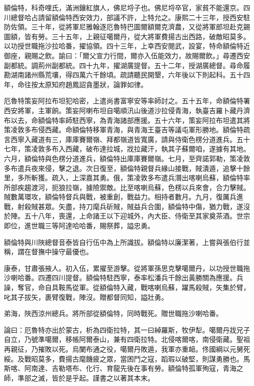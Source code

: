 \begin{pinyinscope}
額倫特，科奇哩氏，滿洲鑲紅旗人，佛尼埒子也。佛尼埒卒官，家貧不能還京。四川總督哈占請留額倫特西安效力，部議不許，上特允之。康熙二十三年，授西安駐防佐領。三十年，從將軍尼雅翰逐厄魯特巴圖爾額爾克濟農，又從將軍郎坦赴克錫圖額，皆有勞。三十五年，上親征噶爾丹，從大將軍費揚古出西路，破敵昭莫多。以功授世職拖沙拉哈番，擢協領。四十三年，上幸西安閱武，設宴，特命額倫特近御座，親賜之飲。諭曰：「爾父宣力行間，爾亦入伍能效力，故賜爾飲。」尋遷西安副都統。調荊州副都統。四十九年，擢湖廣提督。五十二年，授湖廣總督。尋命履勘湖南諸州縣荒壤，得四萬六千餘頃。疏請聽民開墾，六年後以下則起科。五十四年，命往按太原知府趙鳳詔貪墨狀，論罪如律。

厄魯特策妄阿拉布坦犯哈密，上遣尚書富寧安等率師討之。五十五年，命額倫特署西安將軍，主軍餉。策妄阿喇布坦自噶順汛山後道沙拉侵青海，執臺吉羅卜藏丹濟布以去，命額倫特率師駐西寧，為青海諸部應援。五十六年，策妄阿拉布坦遣其將策凌敦多布侵西藏。命額倫特移軍青海，與青海王臺吉等議屯軍形勝地。額倫特疏言西寧入藏道有三，庫庫賽爾嶺、拜都嶺道皆寬廣，請與侍衛色楞分道進兵。五十七年，策凌敦多布入西藏，破布達拉城，戕拉藏汗，執其子蘇爾咱，遂據有其地。六月，額倫特與色楞分道進兵，額倫特出庫庫賽爾嶺。七月，至齊諾郭勒，策凌敦多布遣兵夜來侵，擊之退。次日復至，額倫特親督兵緣山接戰，賊潰遁，追擊十餘里，多所斬獲。疏入，上深嘉其勇。俄，策凌敦多布遣兵潛出喀喇烏蘇，額倫特率所部疾趨渡河，扼狼拉嶺，據險禦敵。比至喀喇烏蘇，色楞以兵來會，合力擊賊。賊數萬環攻，額倫特督兵與戰，被重創，戰益力。相持者數月。九月，復厲兵進戰，射殺賊甚眾。矢盡，持刀麾兵斫賊，賊益兵合圍，額倫特中傷，猶力戰，遂沒於陣。五十八年，喪還，上命諸王以下迎城外，內大臣、侍衛至其家奠茶酒。世宗即位，進世職三等阿達哈哈番，賜祭葬，謚忠勇。

額倫特與川陜總督音泰皆自行伍中為上所識拔。額倫特以廉潔著，上嘗與張伯行並稱，謂在督撫中操守最優也。

康泰，甘肅張掖人。初入伍，累擢至游擊。從將軍孫思克擊噶爾丹，以功授世職拖沙喇哈番。四遷四川提督。額倫特駐西寧，泰率松潘兵千餘出黃勝關為應援。兵譟，奪官，命自具鞍馬從軍。從額倫特入藏，戰喀喇烏蘇，躍馬殺賊，矢集於臂，叱其子拔矢，裹臂復戰，陣沒。贈都督同知，謚壯勇。

弟海，陜西涼州總兵。將所部從額倫特，同時戰死。贈世職拖沙喇哈番。

論曰：厄魯特亦出於蒙古，析為四衛拉特，其一曰綽羅斯，牧伊犁。噶爾丹戕兄子自立，乃號準噶爾，移帳阿爾泰山，兼有四衛拉特。北侵喀爾喀，南侵衛藏。聖祖再親征，乃摧敗以死。烏闌布通之役，噶爾丹敗遁，我軍亦重衄。佟國綱以元舅死綏。及戰昭莫多，費揚古麾饑疲之眾，當困鬥之寇，蹈瑕以破堅，則謀勇勝也。馬斯喀、阿南達、吉勒塔布、化行、育龍先後在事有勞。額倫特孤軍殉寇，青海之師，準部之滅，皆於是乎起。謹書之以著其本末。


\end{pinyinscope}
